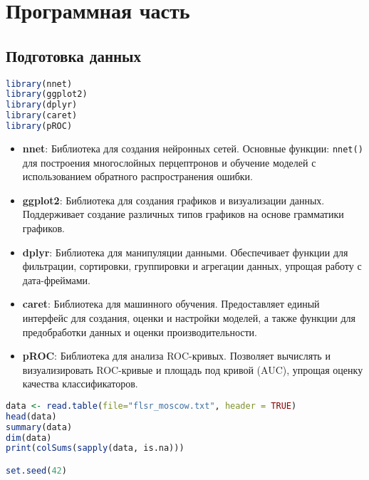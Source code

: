 \setcounter{section}{0} %
\renewcommand\thesection{\arabic{section}} %
\label{cha:practice}

\chapter{Программная часть}
\section{Подготовка данных}
\begin{lstlisting}[language=R, caption={Импорт необходимых библиотек}]
library(nnet)
library(ggplot2)
library(dplyr)
library(caret)
library(pROC)
\end{lstlisting}

\begin{itemize}
	\item \textbf{nnet}: Библиотека для создания нейронных сетей. Основные функции: \texttt{nnet()} для построения многослойных перцептронов и обучение моделей с использованием обратного распространения ошибки.
	
	\item \textbf{ggplot2}: Библиотека для создания графиков и визуализации данных. Поддерживает создание различных типов графиков на основе грамматики графиков.
	
	\item \textbf{dplyr}: Библиотека для манипуляции данными. Обеспечивает функции для фильтрации, сортировки, группировки и агрегации данных, упрощая работу с дата-фреймами.
	
	\item \textbf{caret}: Библиотека для машинного обучения. Предоставляет единый интерфейс для создания, оценки и настройки моделей, а также функции для предобработки данных и оценки производительности.
	
	\item \textbf{pROC}: Библиотека для анализа ROC-кривых. Позволяет вычислять и визуализировать ROC-кривые и площадь под кривой (AUC), упрощая оценку качества классификаторов.
\end{itemize}

\begin{lstlisting}[language=R, caption={Загрузка датасета и задание сида}]
data <- read.table(file="flsr_moscow.txt", header = TRUE)
head(data)
summary(data)
dim(data)
print(colSums(sapply(data, is.na)))

set.seed(42)
\end{lstlisting}

